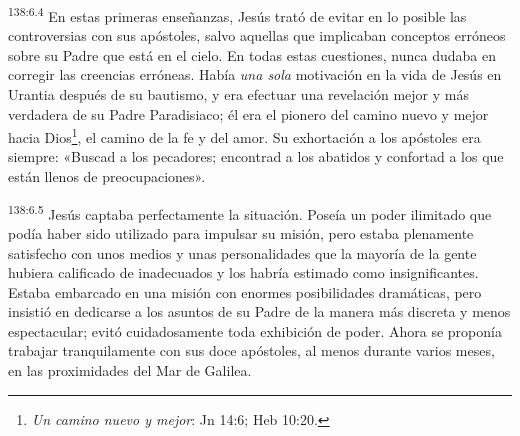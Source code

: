 \par
\textsuperscript{138:6.4} En estas primeras enseñanzas, Jesús trató de evitar en lo posible las controversias con sus apóstoles, salvo aquellas que implicaban conceptos erróneos sobre su Padre que está en el cielo. En todas estas cuestiones, nunca dudaba en corregir las creencias erróneas. Había \textit{una sola} motivación en la vida de Jesús en Urantia después de su bautismo, y era efectuar una revelación mejor y más verdadera de su Padre Paradisiaco; él era el pionero del camino nuevo y mejor hacia Dios\footnote{\textit{Un camino nuevo y mejor}: Jn 14:6; Heb 10:20.}, el camino de la fe y del amor. Su exhortación a los apóstoles era siempre: «Buscad a los pecadores; encontrad a los abatidos y confortad a los que están llenos de preocupaciones».

\par
\textsuperscript{138:6.5} Jesús captaba perfectamente la situación. Poseía un poder ilimitado que podía haber sido utilizado para impulsar su misión, pero estaba plenamente satisfecho con unos medios y unas personalidades que la mayoría de la gente hubiera calificado de inadecuados y los habría estimado como insignificantes. Estaba embarcado en una misión con enormes posibilidades dramáticas, pero insistió en dedicarse a los asuntos de su Padre de la manera más discreta y menos espectacular; evitó cuidadosamente toda exhibición de poder. Ahora se proponía trabajar tranquilamente con sus doce apóstoles, al menos durante varios meses, en las proximidades del Mar de Galilea.

